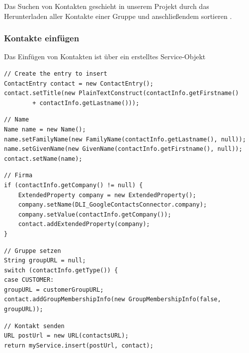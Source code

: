 Das Suchen von Kontakten geschieht in unserem Projekt durch das Herunterladen aller Kontakte
 einer Gruppe und anschließendem sortieren .
\FloatBarrier
\subsubsection{Kontakte einf\"ugen}
Das Einfügen von Kontakten ist über ein erstelltes Service-Objekt 

\begin{lstlisting}[float=h!t]
// Create the entry to insert
ContactEntry contact = new ContactEntry();
contact.setTitle(new PlainTextConstruct(contactInfo.getFirstname()
		+ contactInfo.getLastname()));
\end{lstlisting}

\begin{lstlisting}[float=h!t]
// Name
Name name = new Name();
name.setFamilyName(new FamilyName(contactInfo.getLastname(), null));
name.setGivenName(new GivenName(contactInfo.getFirstname(), null));
contact.setName(name);
\end{lstlisting}

\begin{lstlisting}[float=h!t]
// Firma
if (contactInfo.getCompany() != null) {
	ExtendedProperty company = new ExtendedProperty();
	company.setName(DLI_GoogleContactsConnector.company);
	company.setValue(contactInfo.getCompany());
	contact.addExtendedProperty(company);
}
\end{lstlisting}

\begin{lstlisting}[float=h!t]
// Gruppe setzen
String groupURL = null;
switch (contactInfo.getType()) {
case CUSTOMER:
groupURL = customerGroupURL;
contact.addGroupMembershipInfo(new GroupMembershipInfo(false, groupURL));
\end{lstlisting}

\begin{lstlisting}[float=h!t]
// Kontakt senden		
URL postUrl = new URL(contactsURL);
return myService.insert(postUrl, contact);
\end{lstlisting}
\FloatBarrier